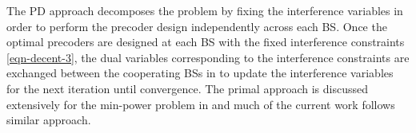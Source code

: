 
The \acl{PD} approach decomposes the problem by fixing the interference variables  in order to perform the precoder design independently across each \ac{BS}. Once the optimal precoders are designed at each \ac{BS} with the fixed interference constraints \eqref{eqn-decent-3}, the dual variables corresponding to the interference constraints are exchanged between the cooperating \acp{BS} in  to update the interference variables  for the next iteration until convergence. The primal approach is discussed extensively for the min-power problem in \cite{pennanen2011decentralized} and much of the current work follows similar approach. 

\begin{comment}
\subsubsection*{Convergence}
The convergence of the primal decomposition is similar to that of the centralized problem if the interference variables \me{\zeta_{l,k,n,b}} are allowed to converge to a stationary point. In practice, we can limit the number of exchanges to \me{J_{\max}} after which the \ac{SCA} update is performed until convergence or for \me{I_{\max}} times. The update of \me{\tilde{p}_{l,k,n}, \tilde{q}_{l,k,n}} and \me{\tilde{\beta}_{l,k,n}} can be made in conjunction with the receiver update \me{\mvec{W}{k,n}}. The receiver update can be made by using the precoded pilot transmission from each user as in \cite{komulainen2013effective}. 
\end{comment}